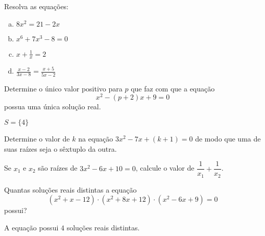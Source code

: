 \begin{secExercicios}
\begin{exer}
    Resolva as equações:
    \begin{enumerate}[a)]
        \item $8x^2=21-2x$
        \item $x^6+7x^3-8=0$
        \item $x+\frac{1}{x} = 2$
        \item $\frac{x-2}{3x-8}=\frac{x+5}{5x-2}$
    \end{enumerate}
\end{exer}

\begin{exer}
Determine o único valor positivo para $p$ que faz com que a equação 
\[x^2 - (p+2)x + 9= 0\]
possua uma única solução real.
\end{exer}
\begin{resp}
 $S= \{4\}$
\end{resp}

\begin{exer}
    Determine o valor de $k$ na equação $3x^2-7x+(k+1)=0$ de modo que uma de suas raízes seja o sêxtuplo da outra.
\end{exer}

\begin{exer}
    Se $x_{1}$ e $x_{2}$ são raízes de $3x^2-6x+10=0$, calcule o valor de $\dfrac{1}{x_{1}}+\dfrac{1}{x_{2}}$.
\end{exer}

\begin{exer}
Quantas soluções reais distintas a equação
\[(x^2 + x - 12)\cdot (x^2 + 8x + 12) \cdot (x^2 - 6x + 9)= 0\]
possui?
\end{exer}
\begin{resp}
  A equação possui $4$ soluções reais distintas.
\end{resp}


\end{secExercicios}




